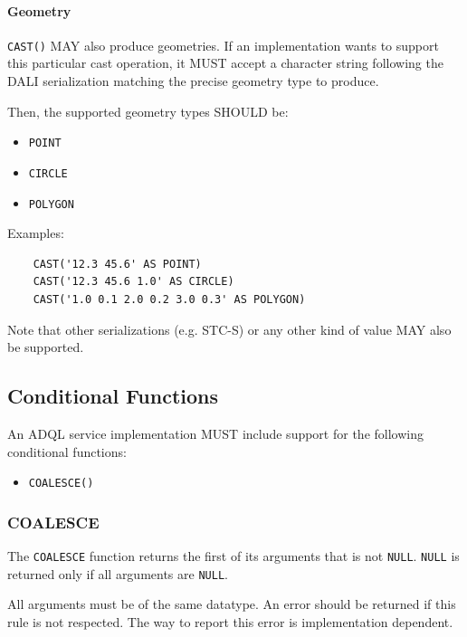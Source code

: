 \documentclass[11pt,a4paper]{ivoa}
\begin{document}
\paragraph{Geometry}

\verb:CAST(): MAY also produce geometries. If an implementation wants to support
this particular cast operation, it MUST accept a character string following the
DALI serialization matching the precise geometry type to produce.

Then, the supported geometry types SHOULD be:

\begin{itemize}
    \item \verb:POINT:
    \item \verb:CIRCLE:
    \item \verb:POLYGON:
\end{itemize}

Examples:

\begin{verbatim}
    CAST('12.3 45.6' AS POINT)
    CAST('12.3 45.6 1.0' AS CIRCLE)
    CAST('1.0 0.1 2.0 0.2 3.0 0.3' AS POLYGON)
\end{verbatim}

Note that other serializations (e.g. STC-S) or any other kind of value MAY also
be supported.

\subsection{Conditional Functions}
\label{sec:condfunc}

An ADQL service implementation MUST include support for the following
conditional functions:

\begin{itemize}
    \item \verb:COALESCE():
\end{itemize}

\subsubsection{COALESCE}
\label{sec:coalesce}

The \texttt{COALESCE} function returns the first of its arguments that is not
\verb|NULL|. \verb|NULL| is returned only if all arguments are \verb|NULL|.

All arguments must be of the same datatype. An error should be returned
if this rule is not respected. The way to report this error is implementation
dependent.
\end{document}
